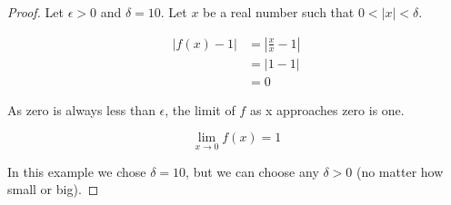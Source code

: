 \documentclass{article}
\begin{document}
\begin{proof}
Let $\epsilon > 0$ and $\delta = 10$. Let $x$ be a real number such that $0 < |x| < \delta$.

\begin{align*}
|f(x) - 1| &= |\frac{x}{x} - 1| \\
&= |1 - 1| \\
&= 0
\end{align*}

As zero is always less than $\epsilon$, the limit of $f$ as x approaches zero is one.

\begin{equation*}
\lim_{x \to 0} f(x) = 1
\end{equation*}

In this example we chose $\delta = 10$, but we can choose any $\delta > 0$ (no matter how small or big).

\end{proof}
\end{document}
